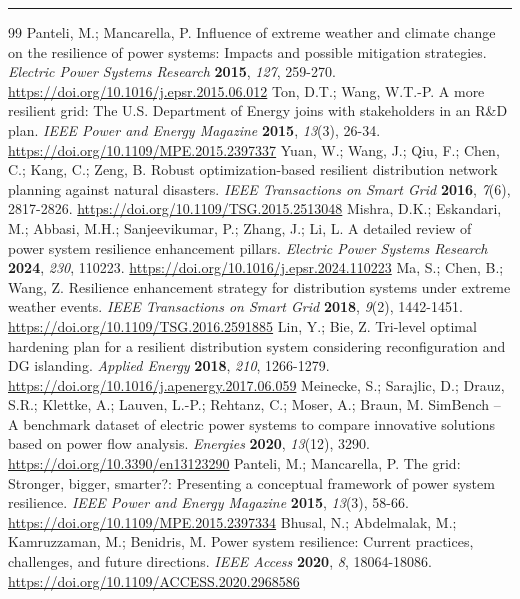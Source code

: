 \documentclass[energies,article,submit,moreauthors]{Definitions/mdpi}
\begin{document}
\begin{center}\rule{0.5\linewidth}{0.5pt}\end{center}

\begin{thebibliography}{99}
 Panteli, M.; Mancarella, P. Influence of extreme weather and climate change on the resilience of power systems: Impacts and possible mitigation strategies. \emph{Electric Power Systems Research} \textbf{2015}, \emph{127}, 259-270. \url{https://doi.org/10.1016/j.epsr.2015.06.012}
 Ton, D.T.; Wang, W.T.-P. A more resilient grid: The U.S. Department of Energy joins with stakeholders in an R\&D plan. \emph{IEEE Power and Energy Magazine} \textbf{2015}, \emph{13}(3), 26-34. \url{https://doi.org/10.1109/MPE.2015.2397337}
 Yuan, W.; Wang, J.; Qiu, F.; Chen, C.; Kang, C.; Zeng, B. Robust optimization-based resilient distribution network planning against natural disasters. \emph{IEEE Transactions on Smart Grid} \textbf{2016}, \emph{7}(6), 2817-2826. \url{https://doi.org/10.1109/TSG.2015.2513048}
 Mishra, D.K.; Eskandari, M.; Abbasi, M.H.; Sanjeevikumar, P.; Zhang, J.; Li, L. A detailed review of power system resilience enhancement pillars. \emph{Electric Power Systems Research} \textbf{2024}, \emph{230}, 110223. \url{https://doi.org/10.1016/j.epsr.2024.110223}
 Ma, S.; Chen, B.; Wang, Z. Resilience enhancement strategy for distribution systems under extreme weather events. \emph{IEEE Transactions on Smart Grid} \textbf{2018}, \emph{9}(2), 1442-1451. \url{https://doi.org/10.1109/TSG.2016.2591885}
 Lin, Y.; Bie, Z. Tri-level optimal hardening plan for a resilient distribution system considering reconfiguration and DG islanding. \emph{Applied Energy} \textbf{2018}, \emph{210}, 1266-1279. \url{https://doi.org/10.1016/j.apenergy.2017.06.059}
 Meinecke, S.; Sarajlic, D.; Drauz, S.R.; Klettke, A.; Lauven, L.-P.; Rehtanz, C.; Moser, A.; Braun, M. SimBench -- A benchmark dataset of electric power systems to compare innovative solutions based on power flow analysis. \emph{Energies} \textbf{2020}, \emph{13}(12), 3290. \url{https://doi.org/10.3390/en13123290}
 Panteli, M.; Mancarella, P. The grid: Stronger, bigger, smarter?: Presenting a conceptual framework of power system resilience. \emph{IEEE Power and Energy Magazine} \textbf{2015}, \emph{13}(3), 58-66. \url{https://doi.org/10.1109/MPE.2015.2397334}
 Bhusal, N.; Abdelmalak, M.; Kamruzzaman, M.; Benidris, M. Power system resilience: Current practices, challenges, and future directions. \emph{IEEE Access} \textbf{2020}, \emph{8}, 18064-18086. \url{https://doi.org/10.1109/ACCESS.2020.2968586}

\end{thebibliography}
\end{document}
